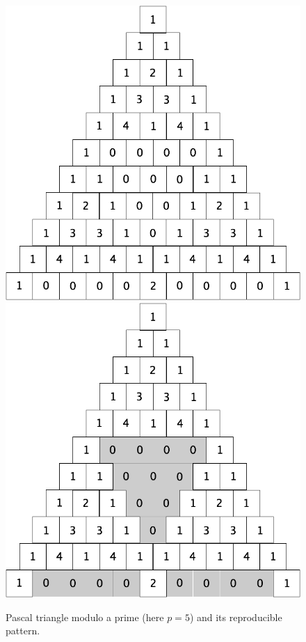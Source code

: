 {\begin{figure}[ht]
\begin{center}
        \includegraphics[scale=0.2]{FiguresArithmetic/TrianglePascalModulo5init.png}
         \includegraphics[scale=0.2]{FiguresArithmetic/TrianglePascalModulo5.png}
        \caption{Pascal triangle modulo a prime (here $p=5$) and its reproducible pattern.}
        \label{fig:TriangleModulo5}
\end{center}
\end{figure}

}
